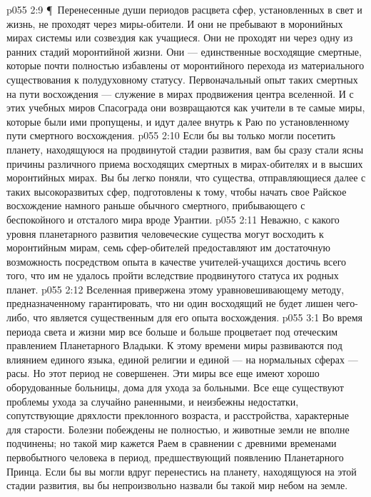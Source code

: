 \vs p055 2:9 \P\ Перенесенные души периодов расцвета сфер, установленных в свет и жизнь, не проходят через миры\hyp{}обители. И они не пребывают в моронийных мирах системы или созвездия как учащиеся. Они не проходят ни через одну из ранних стадий моронтийной жизни. Они --- единственные восходящие смертные, которые почти полностью избавлены от моронтийного перехода из материального существования к полудуховному статусу. Первоначальный опыт таких  смертных на пути восхождения --- служение в мирах продвижения центра вселенной. И с этих учебных миров Спасограда они возвращаются как учители в те самые миры, которые были ими пропущены, и идут далее внутрь к Раю по установленному пути смертного восхождения.
\vs p055 2:10 Если бы вы только могли посетить планету, находящуюся на продвинутой стадии развития, вам бы сразу стали ясны причины различного приема восходящих смертных в мирах\hyp{}обителях и в высших моронтийных мирах. Вы бы легко поняли, что существа, отправляющиеся далее с таких высокоразвитых сфер, подготовлены к тому, чтобы начать свое Райское восхождение намного раньше обычного смертного, прибывающего с беспокойного и отсталого мира вроде Урантии.
\vs p055 2:11 Неважно, с какого уровня планетарного развития человеческие существа могут восходить к моронтийным мирам, семь сфер\hyp{}обителей предоставляют им достаточную возможность посредством опыта в качестве учителей\hyp{}учащихся достичь всего того, что им не удалось пройти вследствие продвинутого статуса их родных планет.
\vs p055 2:12 Вселенная привержена этому уравновешивающему методу, предназначенному гарантировать, что ни один восходящий не будет лишен чего\hyp{}либо, что является существенным для его опыта восхождения.
\vs p055 3:1 Во время периода света и жизни мир все больше и больше процветает под отеческим правлением Планетарного Владыки. К этому времени миры развиваются под влиянием единого языка, единой религии и единой --- на нормальных сферах --- расы. Но этот период не совершенен. Эти миры все еще имеют хорошо оборудованные больницы, дома для ухода за больными. Все еще существуют проблемы ухода за случайно раненными, и неизбежны недостатки, сопутствующие дряхлости преклонного возраста, и расстройства, характерные для старости. Болезни побеждены не полностью, и животные земли не вполне подчинены; но такой мир кажется Раем в сравнении с древними временами первобытного человека в период, предшествующий появлению Планетарного Принца. Если бы вы могли вдруг перенестись на планету, находящуюся на этой стадии развития, вы бы непроизвольно назвали бы такой мир небом на земле.
